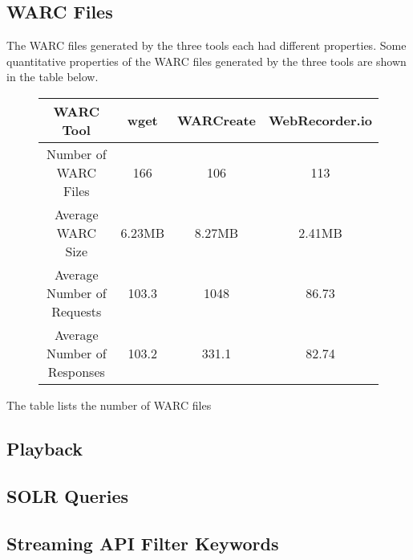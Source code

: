 \documentclass[a4paper,12pt]{article}
\begin{document}
\subsection{WARC Files}
The WARC files generated by the three tools each had different properties. Some quantitative properties of
the WARC files generated by the three tools are shown in the table below.
\begin{figure}[H]
\centering
\begin{tabular}{ | c | c | c | c | }
\hline
WARC Tool                   & wget      & WARCreate & WebRecorder.io    \\ \hline
Number of WARC Files        & 166       & 106       & 113               \\ \hline
Average WARC Size           & 6.23MB    & 8.27MB    & 2.41MB            \\ \hline
Average Number of Requests  & 103.3     & 1048      & 86.73             \\ \hline
Average Number of Responses & 103.2     & 331.1     & 82.74             \\ \hline
\end{tabular}
\end{figure}
The table lists the number of WARC files 

\subsection{Playback}


\subsection{SOLR Queries}





\clearpage
\begin{appendices}

\section{Streaming API Filter Keywords}

\end{appendices}




\clearpage
\begin{thebibliography}{9}

\end{thebibliography}
\end{document}
